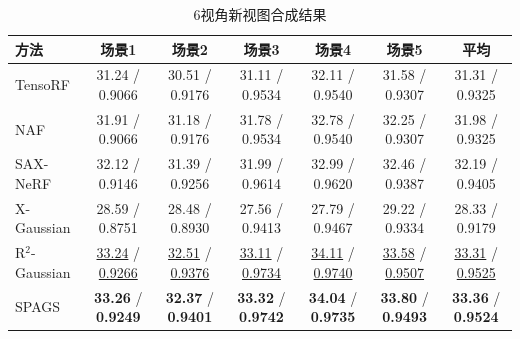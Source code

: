 \begin{table}[htbp]
    \centering
    \caption{6视角新视图合成结果}
    \label{tab:spags_6view}
    \footnotesize
    \begin{tabular*}{\textwidth}{@{\extracolsep{\fill}}lcccccc@{}}
        \toprule
        方法 & 场景1 & 场景2 & 场景3 & 场景4 & 场景5 & 平均 \\
        \midrule
        TensoRF & 31.24 / 0.9066 & 30.51 / 0.9176 & 31.11 / 0.9534 & 32.11 / 0.9540 & 31.58 / 0.9307 & 31.31 / 0.9325 \\
        NAF & 31.91 / 0.9066 & 31.18 / 0.9176 & 31.78 / 0.9534 & 32.78 / 0.9540 & 32.25 / 0.9307 & 31.98 / 0.9325 \\
        SAX-NeRF & 32.12 / 0.9146 & 31.39 / 0.9256 & 31.99 / 0.9614 & 32.99 / 0.9620 & 32.46 / 0.9387 & 32.19 / 0.9405 \\
        X-Gaussian & 28.59 / 0.8751 & 28.48 / 0.8930 & 27.56 / 0.9413 & 27.79 / 0.9467 & 29.22 / 0.9334 & 28.33 / 0.9179 \\
        R$^2$-Gaussian & \underline{33.24} / \underline{0.9266} & \underline{32.51} / \underline{0.9376} & \underline{33.11} / \underline{0.9734} & \underline{34.11} / \underline{0.9740} & \underline{33.58} / \underline{0.9507} & \underline{33.31} / \underline{0.9525} \\
        SPAGS & \textbf{33.26} / \textbf{0.9249} & \textbf{32.37} / \textbf{0.9401} & \textbf{33.32} / \textbf{0.9742} & \textbf{34.04} / \textbf{0.9735} & \textbf{33.80} / \textbf{0.9493} & \textbf{33.36} / \textbf{0.9524} \\
        \bottomrule
    \end{tabular*}
\end{table}

